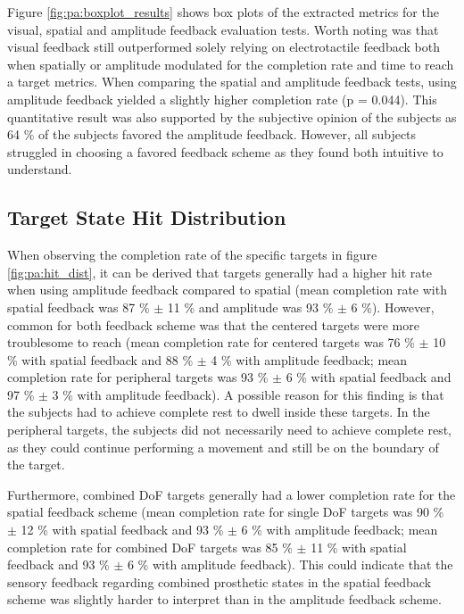 Figure \ref{fig:pa:boxplot_results} shows box plots of the extracted metrics for the visual, spatial and amplitude feedback evaluation tests. Worth noting was that visual feedback still outperformed solely relying on electrotactile feedback both when spatially or amplitude modulated for the completion rate and time to reach a target metrics. When comparing the spatial and amplitude feedback tests, using amplitude feedback yielded a slightly higher completion rate (p = 0.044). This quantitative result was also supported by the subjective opinion of the subjects as 64 \% of the subjects favored the amplitude feedback. However, all subjects struggled in choosing a favored feedback scheme as they found both intuitive to understand. 


\subsection{Target State Hit Distribution}

When observing the completion rate of the specific targets in figure \ref{fig:pa:hit_dist}, it can be derived that targets generally had a higher hit rate when using amplitude feedback compared to spatial (mean completion rate with spatial feedback was 87 \% $\pm$ 11 \% and amplitude was 93 \% $\pm$ 6 \%). However, common for both feedback scheme was that the centered targets were more troublesome to reach (mean completion rate for centered targets was 76 \% $\pm$ 10 \%  with spatial feedback and 88 \%  $\pm$ 4 \% with amplitude feedback; mean completion rate for peripheral targets was 93 \% $\pm$ 6 \% with spatial feedback and 97 \% $\pm$ 3 \% with amplitude feedback). A possible reason for this finding is that the subjects had to achieve complete rest to dwell inside these targets. In the peripheral targets, the subjects did not necessarily need to achieve complete rest, as they could continue performing a movement and still be on the boundary of the target. 

Furthermore, combined DoF targets generally had a lower completion rate for the spatial feedback scheme (mean completion rate for single DoF targets was 90 \% $\pm$ 12 \% with spatial feedback and 93 \% $\pm$ 6 \% with amplitude feedback; mean completion rate for combined DoF targets was 85 \% $\pm$ 11 \% with spatial feedback and 93 \% $\pm$ 6 \% with amplitude feedback). This could indicate that the sensory feedback regarding combined prosthetic states in the spatial feedback scheme was slightly harder to interpret than in the amplitude feedback scheme. 


